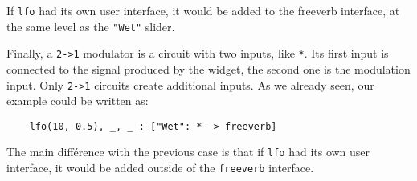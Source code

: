 If \lstinline`lfo` had its own user interface, it would be added to the freeverb interface, at the same level as the \lstinline`"Wet"` slider. 

Finally, a \lstinline`2->1` modulator is a circuit with two inputs, like \lstinline`*`. Its first input is connected to the signal produced by the widget, the second one is the modulation input. Only \lstinline`2->1` circuits create additional inputs. As we already seen, our example could be written as:

\begin{lstlisting}
	lfo(10, 0.5), _, _ : ["Wet": * -> freeverb]
\end{lstlisting}
	
The main différence with the previous case is that if \lstinline`lfo` had its own user interface, it would be added outside of the \lstinline`freeverb` interface.
